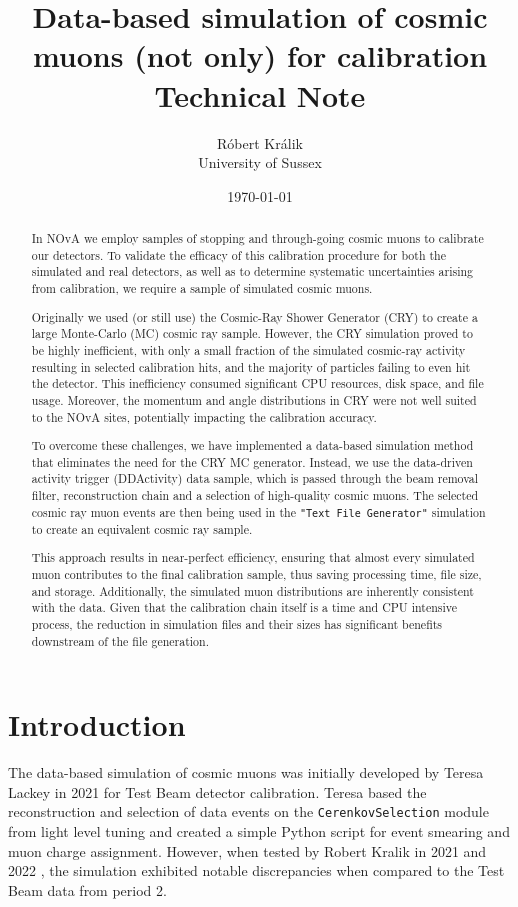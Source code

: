 \documentclass[12pt]{article}
\author{Róbert Králik\\\small{University of Sussex}}
\title{\textbf{Data-based simulation of cosmic muons (not only) for calibration\\ \vspace*{5mm}
\Large{Technical Note}}}
\date{\today}
\begin{document}
\maketitle
\begin{abstract}
In NOvA we employ samples of stopping and through-going cosmic muons to calibrate our detectors. To validate the efficacy of this calibration procedure for both the simulated and real detectors, as well as to determine systematic uncertainties arising from calibration, we require a sample of simulated cosmic muons.

Originally we used (or still use) the Cosmic-Ray Shower Generator (CRY) \cite{CRY} to create a large Monte-Carlo (MC) cosmic ray sample. However, the CRY simulation proved to be highly inefficient, with only a small fraction of the simulated cosmic-ray activity resulting in selected calibration hits, and the majority of particles failing to even hit the detector. This inefficiency consumed significant CPU resources, disk space, and file usage. Moreover, the momentum and angle distributions in CRY were not well suited to the NOvA sites, potentially impacting the calibration accuracy.

To overcome these challenges, we have implemented a data-based simulation method that eliminates the need for the CRY MC generator. Instead, we use the data-driven activity trigger (DDActivity) data sample, which is passed through the beam removal filter, reconstruction chain and a selection of high-quality cosmic muons. The selected cosmic ray muon events are then being used in the \texttt{"Text File Generator"} simulation to create an equivalent cosmic ray sample.

This approach results in near-perfect efficiency, ensuring that almost every simulated muon contributes to the final calibration sample, thus saving processing time, file size, and storage. Additionally, the simulated muon distributions are inherently consistent with the data. Given that the calibration chain itself is a time and CPU intensive process, the reduction in simulation files and their sizes has significant benefits downstream of the file generation.
\end{abstract}

\newpage
\tableofcontents

\section{Introduction}
The data-based simulation of cosmic muons was initially developed by Teresa Lackey \cite{LackeyThesis} in 2021 for Test Beam detector calibration. Teresa based the reconstruction and selection of data events on the \texttt{CerenkovSelection} module from light level tuning and created a simple Python script for event smearing and muon charge assignment. However, when tested by Robert Kralik in 2021 and 2022 \cite{NOVA-doc-54417-v1}, the simulation exhibited notable discrepancies when compared to the Test Beam data from period 2.
\end{document}

